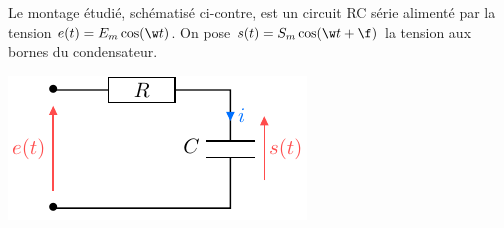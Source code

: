 \documentclass[../main/main.tex]{subfiles}
\begin{document}
\begin{minipage}{0.60\linewidth}
	Le montage étudié, schématisé ci-contre, est un circuit RC série alimenté
	par la tension $e(t) = E_{m} \cos(\w t)$. On pose $s(t) = S_{m} \cos (\w t +
		\f)$ la tension aux bornes du condensateur.
\end{minipage}
\hfill
\begin{minipage}{0.35\linewidth}
	\begin{center}
		\includegraphics[width=\linewidth]{filtre_rc}
	\end{center}
\end{minipage}


\end{document}
